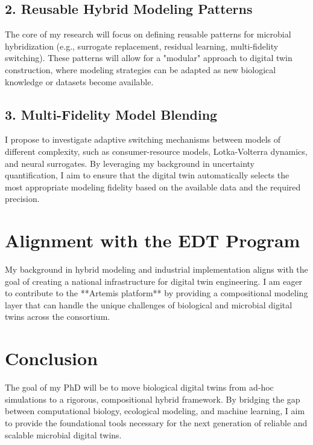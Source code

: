 \documentclass[a4paper,11pt]{article}
\begin{document}
\subsection{2. Reusable Hybrid Modeling Patterns}
The core of my research will focus on defining reusable patterns for microbial hybridization (e.g., surrogate replacement, residual learning, multi-fidelity switching). These patterns will allow for a "modular" approach to digital twin construction, where modeling strategies can be adapted as new biological knowledge or datasets become available.

\subsection{3. Multi-Fidelity Model Blending}
I propose to investigate adaptive switching mechanisms between models of different complexity, such as consumer-resource models, Lotka-Volterra dynamics, and neural surrogates. By leveraging my background in uncertainty quantification, I aim to ensure that the digital twin automatically selects the most appropriate modeling fidelity based on the available data and the required precision.

\section{Alignment with the EDT Program}
My background in hybrid modeling and industrial implementation aligns with the goal of creating a national infrastructure for digital twin engineering. I am eager to contribute to the **Artemis platform** by providing a compositional modeling layer that can handle the unique challenges of biological and microbial digital twins across the consortium.

\section{Conclusion}
The goal of my PhD will be to move biological digital twins from ad-hoc simulations to a rigorous, compositional hybrid framework. By bridging the gap between computational biology, ecological modeling, and machine learning, I aim to provide the foundational tools necessary for the next generation of reliable and scalable microbial digital twins.
\end{document}
